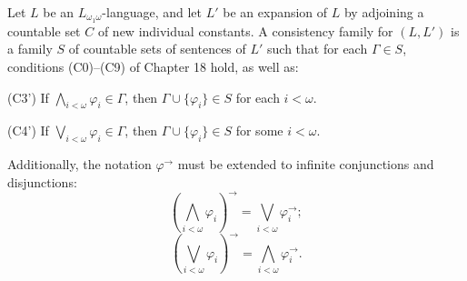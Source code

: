 Let $L$ be an $L_{\omega_1\omega}$-language, and let $L'$ be an expansion of $L$ by adjoining a countable set $C$ of new individual constants. A consistency family for $(L, L')$ is a family $S$ of countable sets of sentences of $L'$ such that for each $\Gamma \in S$, conditions (C0)--(C9) of Chapter 18 hold, as well as:

(C3') If $\bigwedge_{i < \omega} \varphi_i \in \Gamma$, then $\Gamma \cup \{\varphi_i\} \in S$ for each $i < \omega$.

(C4') If $\bigvee_{i < \omega} \varphi_i \in \Gamma$, then $\Gamma \cup \{\varphi_i\} \in S$ for some $i < \omega$.

Additionally, the notation $\varphi^\rightarrow$ must be extended to infinite conjunctions and disjunctions:
$$\left(\bigwedge_{i < \omega} \varphi_i\right)^\rightarrow = \bigvee_{i < \omega} \varphi_i^\rightarrow;$$
$$\left(\bigvee_{i < \omega} \varphi_i\right)^\rightarrow = \bigwedge_{i < \omega} \varphi_i^\rightarrow.$$
